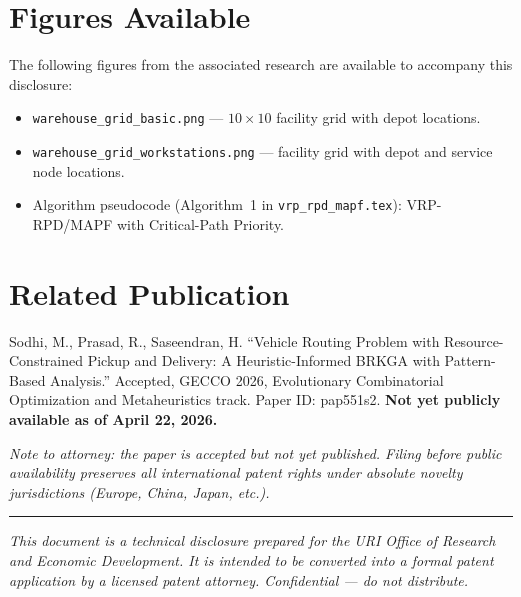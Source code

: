 \documentclass[12pt]{article}
\begin{document}
\section{Figures Available}

The following figures from the associated research are available to accompany this disclosure:

\begin{itemize}[leftmargin=2em]
    \item \texttt{warehouse\_grid\_basic.png} --- $10\times10$ facility grid with depot locations.
    \item \texttt{warehouse\_grid\_workstations.png} --- facility grid with depot and service node locations.
    \item Algorithm pseudocode (Algorithm~1 in \texttt{vrp\_rpd\_mapf.tex}): VRP-RPD/MAPF with Critical-Path Priority.
\end{itemize}

\section{Related Publication}

Sodhi, M., Prasad, R., Saseendran, H. ``Vehicle Routing Problem with Resource-Constrained Pickup and Delivery: A Heuristic-Informed BRKGA with Pattern-Based Analysis.'' Accepted, GECCO 2026, Evolutionary Combinatorial Optimization and Metaheuristics track. Paper ID: pap551s2. \textbf{Not yet publicly available as of April 22, 2026.}

\medskip
\noindent\textit{Note to attorney: the paper is accepted but not yet published. Filing before public availability preserves all international patent rights under absolute novelty jurisdictions (Europe, China, Japan, etc.).}

\vspace{24pt}
\hrule
\vspace{8pt}
\noindent\small\textit{This document is a technical disclosure prepared for the URI Office of Research and Economic Development. It is intended to be converted into a formal patent application by a licensed patent attorney. Confidential --- do not distribute.}
\end{document}
